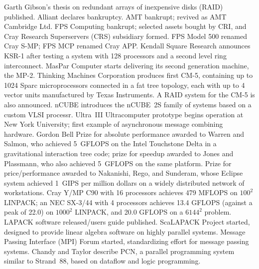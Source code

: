 	{Garth Gibson's thesis on redundant arrays of inexpensive disks
	(RAID) published.}
	{Alliant declares bankruptcy.}
	{AMT bankrupt; revived as AMT Cambridge Ltd.}
        {FPS Computing bankrupt; selected assets bought by CRI,
	and Cray Research Superservers (CRS) subsidiary formed.
	FPS Model 500 renamed Cray S-MP;
	FPS MCP renamed Cray APP.}
	{Kendall Square Research announces KSR-1 after testing
	a system with 128 processors and a second level ring interconnect.}
	{MasPar Computer starts delivering its second generation machine,
	the MP-2.}
	{Thinking Machines Corporation produces first CM-5,
	containing up to 1024 Sparc microprocessors
	connected in a fat tree topology,
	each with up to 4 vector units
	manufactured by Texas Instruments.
	A RAID system for the CM-5 is also announced.}
	{nCUBE introduces the nCUBE~2S family of systems
	based on a custom VLSI processr.}
	{Ultra~III Ultracomputer prototype begins operation
	at New York University;
	first example of asynchronous message combining hardware.}
	{Gordon Bell Prize for absolute performance awarded to
	Warren and Salmon,
	who achieved 5~GFLOPS on the Intel Touchstone Delta
	in a gravitational interaction tree code;
	prize for speedup awarded to Jones and Plassmann,
	who also achieved 5~GFLOPS on the same platform.
	Prize for price/performance awarded to Nakanishi, Rego, and Sunderam,
	whose Eclipse system achieved 1~GIPS per million dollars
	on a widely distributed network of workstations.}
	{Cray Y/MP C90 with 16 processors achieves 479 MFLOPS
	on $100^2$ LINPACK;
	an NEC SX-3/44 with 4 processors achieves 13.4 GFLOPS
	(against a peak of 22.0)
	on $1000^2$ LINPACK,
	and 20.0 GFLOPS on a $6144^2$ problem.}
        {LAPACK software released/users guide published.
	ScaLAPACK Project started, designed to provide linear algebra software
	on highly parallel systems.
	Message Passing Interface (MPI) Forum started, standardizing effort
	for message passing systems.}
	{Chandy and Taylor describe PCN,
	a parallel programming system similar to Strand~88,
	based on dataflow and logic programming.}

